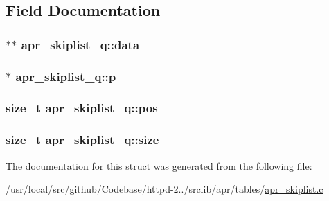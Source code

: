 \subsection{Field Documentation}
\subsubsection[{\texorpdfstring{data}{data}}]{$\ast$$\ast$ apr\+\_\+skiplist\+\_\+q\+::data}\hypertarget{structapr__skiplist__q_a7800b2a0b2813b7588f37cbc70e6cae9}{}\label{structapr__skiplist__q_a7800b2a0b2813b7588f37cbc70e6cae9}
\subsubsection[{\texorpdfstring{p}{p}}]{$\ast$ apr\+\_\+skiplist\+\_\+q\+::p}\hypertarget{structapr__skiplist__q_a3d307b77b55df9859a2d8b169fbdf2f6}{}\label{structapr__skiplist__q_a3d307b77b55df9859a2d8b169fbdf2f6}
\subsubsection[{\texorpdfstring{pos}{pos}}]{\setlength{\rightskip}{0pt plus 5cm}size\+\_\+t apr\+\_\+skiplist\+\_\+q\+::pos}\hypertarget{structapr__skiplist__q_a0a64c71c8598ec26ef95122a83d74da2}{}\label{structapr__skiplist__q_a0a64c71c8598ec26ef95122a83d74da2}
\subsubsection[{\texorpdfstring{size}{size}}]{\setlength{\rightskip}{0pt plus 5cm}size\+\_\+t apr\+\_\+skiplist\+\_\+q\+::size}\hypertarget{structapr__skiplist__q_ae40316b51ae2fcce912d94300b03eb38}{}\label{structapr__skiplist__q_ae40316b51ae2fcce912d94300b03eb38}


The documentation for this struct was generated from the following file\+:\begin{DoxyCompactItemize}
\item 
/usr/local/src/github/\+Codebase/httpd-\/2../srclib/apr/tables/\hyperlink{apr__skiplist_8c}{apr\+\_\+skiplist.\+c}\end{DoxyCompactItemize}
